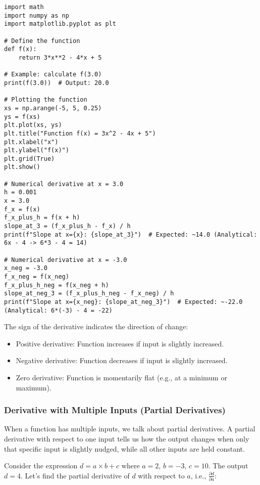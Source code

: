 \begin{lstlisting}[caption={Numerical Derivative Calculation}] 
import math 
import numpy as np 
import matplotlib.pyplot as plt

# Define the function
def f(x): 
    return 3*x**2 - 4*x + 5

# Example: calculate f(3.0)
print(f(3.0))  # Output: 20.0

# Plotting the function
xs = np.arange(-5, 5, 0.25) 
ys = f(xs) 
plt.plot(xs, ys) 
plt.title("Function f(x) = 3x^2 - 4x + 5") 
plt.xlabel("x") 
plt.ylabel("f(x)") 
plt.grid(True) 
plt.show()

# Numerical derivative at x = 3.0
h = 0.001 
x = 3.0 
f_x = f(x) 
f_x_plus_h = f(x + h) 
slope_at_3 = (f_x_plus_h - f_x) / h 
print(f"Slope at x={x}: {slope_at_3}")  # Expected: ~14.0 (Analytical: 6x - 4 -> 6*3 - 4 = 14)

# Numerical derivative at x = -3.0
x_neg = -3.0 
f_x_neg = f(x_neg) 
f_x_plus_h_neg = f(x_neg + h) 
slope_at_neg_3 = (f_x_plus_h_neg - f_x_neg) / h 
print(f"Slope at x={x_neg}: {slope_at_neg_3}")  # Expected: ~-22.0 (Analytical: 6*(-3) - 4 = -22) 
\end{lstlisting} 

The sign of the derivative indicates the direction of change: 
\begin{itemize} 
\item Positive derivative: Function increases if input is slightly increased. 
\item Negative derivative: Function decreases if input is slightly increased. 
\item Zero derivative: Function is momentarily flat (e.g., at a minimum or maximum). 
\end{itemize}

\subsubsection{Derivative with Multiple Inputs (Partial Derivatives)} 
When a function has multiple inputs, we talk about partial derivatives. A partial derivative with respect to one input tells us how the output changes when only that specific input is slightly nudged, while all other inputs are held constant.

Consider the expression $d = a \times b + c$ where $a=2$, $b=-3$, $c=10$. The output $d=4$. Let's find the partial derivative of $d$ with respect to $a$, i.e., $\frac{\partial d}{\partial a}$: 

